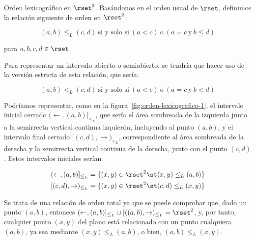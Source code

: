 Orden lexicográfico en $\rset^2$. Basándonos en el orden usual de $\rset$,
definimos la relación siguiente de orden en $\rset^2$:

$$ (a, b) \leq_L (c, d) \ \text{si y solo si} \ (a < c) \ \text{o} \ (a = c
\ \text{y} \ b \leq d) $$

\noindent para $a, b, c, d \in \rset$.

Para representar un intervalo abierto o semiabierto, se tendría que hacer
uso de la versión estricta de esta relación, que sería:

$$ (a, b) <_L (c, d) \ \text{si y solo si} \ (a < c) \ \text{o} \ (a = c \
\text{y} \ b < d) $$

Podríamos representar, como en la figura~\ref{fig:orden-lexicografico-1}, el
intervalo inicial cerrado $(\leftarrow, (a, b)]_{\leq_L}$, que sería el área
sombreada de la izquierda junto a la semirrecta vertical continua izquierda,
incluyendo al punto $(a, b)$, y el intervalo final cerrado $[(c, d),
\rightarrow)_{\leq_L}$, correspondiente al área sombreada de la derecha y la
semirrecta vertical continua de la derecha, junto con el punto $(c, d)$.
Estos intervalos iniciales serían

\begin{align*}
  (\leftarrow, (a, b)]_{\leq_L}
    &= \{(x, y) \in \rset^2 \st (x, y) \leq _L (a, b)\} \\
  [(c, d), \rightarrow)_{\leq_L}
    &= \{(x, y) \in \rset^2 \st (c, d) \leq _L (x, y)\} \\
\end{align*}

Se trata de una relación de orden total ya que se puede comprobar que, dado
un punto $(a, b)$, entonces $(\leftarrow, (a, b)]_{\leq_L} \cup [((a, b),
\rightarrow)_{\leq_L} = \rset^2$, y, por tanto, cualquier punto $(x, y)$ del
plano está relacionado con un punto cualquiera $(a, b)$, ya sea mediante
$(x, y) \leq_L (a, b)$, o bien, $(a, b) \leq_L (x, y)$.

